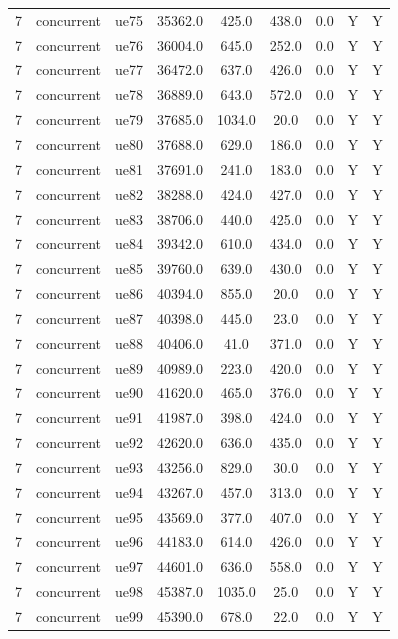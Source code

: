\begin{table}[ht]
\begin{tabular}{|c|c|c|c|c|c|c|c|c|}
7 & concurrent & ue75 & 35362.0 & 425.0 & 438.0 & 0.0 & Y & Y \\
7 & concurrent & ue76 & 36004.0 & 645.0 & 252.0 & 0.0 & Y & Y \\
7 & concurrent & ue77 & 36472.0 & 637.0 & 426.0 & 0.0 & Y & Y \\
7 & concurrent & ue78 & 36889.0 & 643.0 & 572.0 & 0.0 & Y & Y \\
7 & concurrent & ue79 & 37685.0 & 1034.0 & 20.0 & 0.0 & Y & Y \\
7 & concurrent & ue80 & 37688.0 & 629.0 & 186.0 & 0.0 & Y & Y \\
7 & concurrent & ue81 & 37691.0 & 241.0 & 183.0 & 0.0 & Y & Y \\
7 & concurrent & ue82 & 38288.0 & 424.0 & 427.0 & 0.0 & Y & Y \\
7 & concurrent & ue83 & 38706.0 & 440.0 & 425.0 & 0.0 & Y & Y \\
7 & concurrent & ue84 & 39342.0 & 610.0 & 434.0 & 0.0 & Y & Y \\
7 & concurrent & ue85 & 39760.0 & 639.0 & 430.0 & 0.0 & Y & Y \\
7 & concurrent & ue86 & 40394.0 & 855.0 & 20.0 & 0.0 & Y & Y \\
7 & concurrent & ue87 & 40398.0 & 445.0 & 23.0 & 0.0 & Y & Y \\
7 & concurrent & ue88 & 40406.0 & 41.0 & 371.0 & 0.0 & Y & Y \\
7 & concurrent & ue89 & 40989.0 & 223.0 & 420.0 & 0.0 & Y & Y \\
7 & concurrent & ue90 & 41620.0 & 465.0 & 376.0 & 0.0 & Y & Y \\
7 & concurrent & ue91 & 41987.0 & 398.0 & 424.0 & 0.0 & Y & Y \\
7 & concurrent & ue92 & 42620.0 & 636.0 & 435.0 & 0.0 & Y & Y \\
7 & concurrent & ue93 & 43256.0 & 829.0 & 30.0 & 0.0 & Y & Y \\
7 & concurrent & ue94 & 43267.0 & 457.0 & 313.0 & 0.0 & Y & Y \\
7 & concurrent & ue95 & 43569.0 & 377.0 & 407.0 & 0.0 & Y & Y \\
7 & concurrent & ue96 & 44183.0 & 614.0 & 426.0 & 0.0 & Y & Y \\
7 & concurrent & ue97 & 44601.0 & 636.0 & 558.0 & 0.0 & Y & Y \\
7 & concurrent & ue98 & 45387.0 & 1035.0 & 25.0 & 0.0 & Y & Y \\
7 & concurrent & ue99 & 45390.0 & 678.0 & 22.0 & 0.0 & Y & Y \\

\end{tabular}
\end{table}
